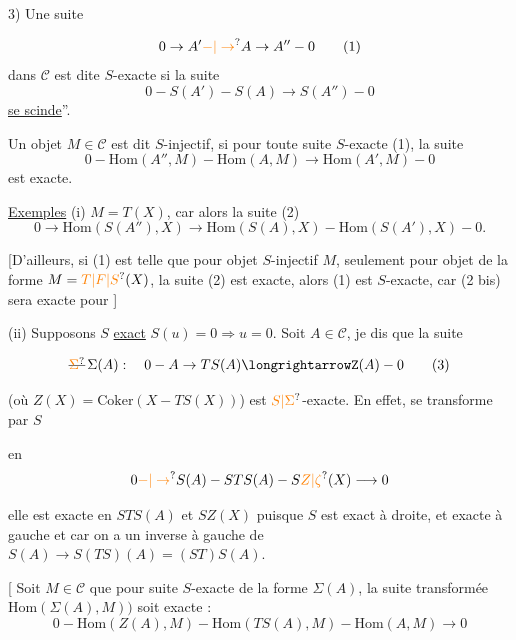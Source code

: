 3) Une suite

\[
0\to A'\unsure{-|\to} A\to A''-0 \tag*{(1)}
\]
dans $\mathcal C$ est dite $S$-exacte si la suite
\[
0-S(A')-S(A)\to S(A'')-0 \tag*{(1 bis)}
\]
  \uline{se scinde}''.

Un objet $M\in\mathcal C$ est dit $S$-injectif, si pour toute suite $S$-exacte (1), la suite
\[
0-\mathrm{Hom}(A'',M)-\mathrm{Hom}(A,M)\longrightarrow\mathrm{Hom}(A',M)-0 \tag*{(2)}
\]
est exacte.

\uline{Exemples} (i) $M=T(X)$, car alors la suite (2) 
\[
0\to\mathrm{Hom}(S(A''),X)\to\mathrm{Hom}(S(A),X)-\mathrm{Hom}(S(A'),X)-0. \tag*{(2 bis)}
\]

[D'ailleurs, si (1) est telle que pour  objet $S$-injectif $M$,    seulement pour  objet de la forme $M=\unsure{T|F|S}(X)$,  la suite (2) est exacte, alors (1) est $S$-exacte, car  (2 bis) sera exacte pour  ]


(ii) Supposons $S$ \uline{exact}   $S(u)=0\Longrightarrow u=0$. Soit $A\in\mathcal C$, je dis que la suite

\[
\deleted{\unsure{\Sigma}}\,\Sigma(A):\quad 0-A\to TS(A)\longrightarrowZ(A)-0 \tag*{(3)}
\]

(où $Z(X)=\mathrm{Coker}(X-TS(X))$) est $\unsure{S|\Sigma}$-exacte. En effet,  se transforme par $S$

en
\[
0\unsure{-|\to}S(A)-STS(A)-S\unsure{Z|\zeta}(X)\longrightarrow0
\]

elle est exacte en $STS(A)$ et $SZ(X)$ puisque $S$ est exact à droite, et exacte à gauche et  car on a  un inverse à  gauche de $S(A)\to S(TS)(A)=(ST)S(A)$.

[ Soit $M\in\mathcal C$  que pour  suite  $S$-exacte de la forme $\Sigma(A)$, la suite transformée $\mathrm{Hom}(\Sigma(A),M))$ soit exacte :
\[
0-\mathrm{Hom}(Z(A),M)-\mathrm{Hom}(TS(A),M)-\mathrm{Hom}(A,M)\to0
\]

